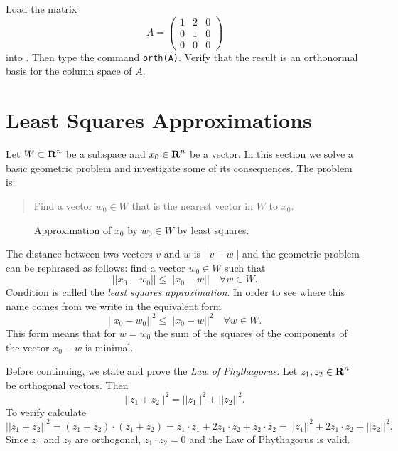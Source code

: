 \CEXER

\begin{exercise} \label{c7.4.3}
Load the matrix
\[
A=\left(\begin{array}{rrr} 1 & 2 & 0\\ 0 & 1 & 0\\
0 & 0 & 0\end{array}\right)
\]
into \Matlabp.  Then type the command {\tt orth(A)}.
Verify that the result is an orthonormal basis for the column space of $A$.
\end{exercise}



\section{Least Squares Approximations}  \label{S:LSA}

Let $W\subset\mbox{$\bf{R}$}^n$ be a subspace and $x_0\in\mbox{$\bf{R}$}^n$ be a vector.  In this
section we solve a basic geometric problem and investigate some of its
consequences.  The problem is:
\begin{quote}
Find a vector $w_0\in W$ that is the nearest vector in $W$ to $x_0$.
\end{quote}

\begin{figure}[htb]
        \centerline{%
        }
        \caption{Approximation of $x_0$ by $w_0\in W$ by least squares.}
        \label{F:nearest}
\end{figure}


The distance between two vectors
$v$ and $w$ is $||v-w||$ and the geometric
problem can be rephrased as follows: find a vector $w_0\in W$ such that
\begin{equation}  \label{E:leastsq}
||x_0-w_0||\leq ||x_0-w|| \quad \forall w\in W.
\end{equation}
Condition  is called the
{\em least squares approximation}.
In order to see where this name comes from we write in the
equivalent form
\[
||x_0-w_0||^2\leq ||x_0-w||^2 \quad \forall w\in W.
\]
This form means that for $w=w_0$ the sum of the squares of the
components of the vector $x_0-w$ is minimal.

Before continuing, we state and prove the {\em Law of Phythagorus\/}.
  Let $z_1,z_2\in\mbox{$\bf{R}$}^n$ be orthogonal vectors.  Then 
\begin{equation} \label{E:LP}
||z_1+z_2||^2 = ||z_1||^2 + ||z_2||^2.
\end{equation}
To verify  calculate 
\[
||z_1+z_2||^2=(z_1+z_2)\cdot(z_1+z_2)=z_1\cdot z_1 +2z_1\cdot z_2+z_2\cdot z_2
=||z_1||^2 + 2z_1\cdot z_2 +||z_2||^2.
\]
Since $z_1$ and $z_2$ are orthogonal, $z_1\cdot z_2=0$ and the Law of 
Phythagorus is valid.

